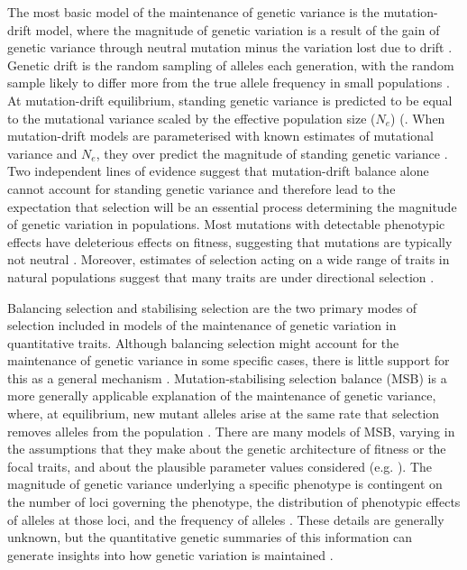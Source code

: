 The most basic model of the maintenance of genetic variance is the mutation-drift model, where the magnitude of genetic variation is a result of the gain of genetic variance through neutral mutation minus the variation lost due to drift \citep{Fran80, Bart90}. Genetic drift is the random sampling of alleles each generation, with the random sample likely to differ more from the true allele frequency in small populations \citep{Land76}. At mutation-drift equilibrium, standing genetic variance is predicted to be equal to the mutational variance scaled by the effective population size ($N_e$) (\citep{Lync86}. When mutation-drift models are parameterised with known estimates of mutational variance and $N_e$, they over predict the magnitude of standing genetic variance \citep{John05, Wals18c28, McGu15}. Two independent lines of evidence suggest that mutation-drift balance alone cannot account for standing genetic variance and therefore lead to the expectation that selection will be an essential process determining the magnitude of genetic variation in populations. Most mutations with detectable phenotypic effects have deleterious effects on fitness, suggesting that mutations are typically not neutral \citep{Kond92, Hall09}. Moreover, estimates of selection acting on a wide range of traits in natural populations suggest that many traits are under directional selection \citep{King01, King12}.\par  

Balancing selection and stabilising selection are the two primary modes of selection included in models of the maintenance of genetic variation in quantitative traits. Although balancing selection might account for the maintenance of genetic variance in some specific cases, there is little support for this as a general mechanism \citep{Bart90, John05, Hedr12}. Mutation-stabilising selection balance (MSB) is a more generally applicable explanation of the maintenance of genetic variance, where, at equilibrium, new mutant alleles arise at the same rate that selection removes alleles from the population \citep{Trot14, John05, Zhan05}. There are many models of MSB, varying in the assumptions that they make about the genetic architecture of fitness or the focal traits, and about the plausible parameter values considered (e.g. \citealt{Latt70, Land75, Ture85, Keig88, Burg89, Kond92, Houl96, John05, Wals18c28}). The magnitude of genetic variance underlying a specific phenotype is contingent on the number of loci governing the phenotype, the distribution of phenotypic effects of alleles at those loci, and the frequency of alleles \citep{Ture88}. These details are generally unknown, but the quantitative genetic summaries of this information can generate insights into how genetic variation is maintained \citep{John05}.\par

